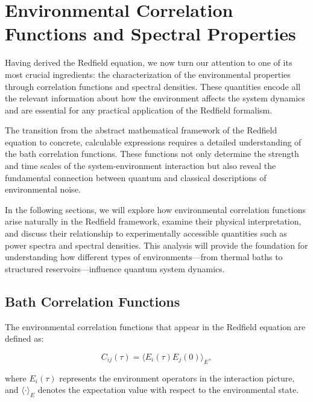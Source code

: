 
\section{Environmental Correlation Functions and Spectral Properties}
\label{sec:environmental_correlation_functions}

Having derived the Redfield equation, we now turn our attention to one of its most crucial ingredients: the characterization of the environmental properties through correlation functions and spectral densities. These quantities encode all the relevant information about how the environment affects the system dynamics and are essential for any practical application of the Redfield formalism.

The transition from the abstract mathematical framework of the Redfield equation to concrete, calculable expressions requires a detailed understanding of the bath correlation functions. These functions not only determine the strength and time scales of the system-environment interaction but also reveal the fundamental connection between quantum and classical descriptions of environmental noise.

In the following sections, we will explore how environmental correlation functions arise naturally in the Redfield framework, examine their physical interpretation, and discuss their relationship to experimentally accessible quantities such as power spectra and spectral densities. This analysis will provide the foundation for understanding how different types of environments—from thermal baths to structured reservoirs—influence quantum system dynamics.

\subsection{Bath Correlation Functions}

The environmental correlation functions that appear in the Redfield equation are defined as:

\begin{equation}
    C_{ij}(\tau) = \langle E_i(\tau) E_j(0) \rangle_E,
    \label{eq:bath_correlator_general}
\end{equation}

where $E_i(\tau)$ represents the environment operators in the interaction picture, and $\langle \cdot \rangle_E$ denotes the expectation value with respect to the environmental state.

